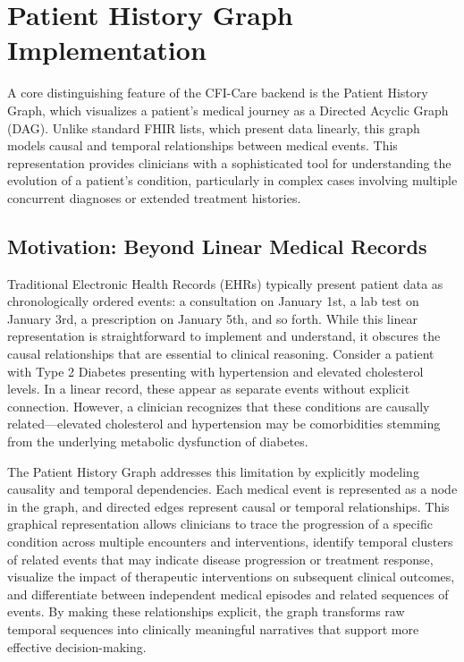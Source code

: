 \section{Patient History Graph Implementation}
\label{sec:graph_logic}

A core distinguishing feature of the CFI-Care backend is the Patient History
Graph, which visualizes a patient's medical journey as a Directed Acyclic Graph
(DAG). Unlike standard FHIR lists, which present data linearly, this graph
models causal and temporal relationships between medical events. This
representation provides clinicians with a sophisticated tool for understanding
the evolution of a patient's condition, particularly in complex cases involving
multiple concurrent diagnoses or extended treatment histories.

\subsection{Motivation: Beyond Linear Medical Records}
\label{subsec:graph_motivation}

Traditional Electronic Health Records (\ac{EHR}s) typically present patient
data as chronologically ordered events: a consultation on January 1st, a lab
test on January 3rd, a prescription on January 5th, and so forth. While this
linear representation is straightforward to implement and understand, it
obscures the causal relationships that are essential to clinical reasoning.
Consider a patient with Type 2 Diabetes presenting with hypertension and
elevated cholesterol levels. In a linear record, these appear as separate
events without explicit connection. However, a clinician recognizes that these
conditions are causally related---elevated cholesterol and hypertension may be
comorbidities stemming from the underlying metabolic dysfunction of diabetes.

The Patient History Graph addresses this limitation by explicitly modeling
causality and temporal dependencies. Each medical event is represented as a
node in the graph, and directed edges represent causal or temporal
relationships. This graphical representation allows clinicians to trace the
progression of a specific condition across multiple encounters and
interventions, identify temporal clusters of related events that may indicate
disease progression or treatment response, visualize the impact of therapeutic
interventions on subsequent clinical outcomes, and differentiate between
independent medical episodes and related sequences of events. By making these
relationships explicit, the graph transforms raw temporal sequences into
clinically meaningful narratives that support more effective decision-making.

